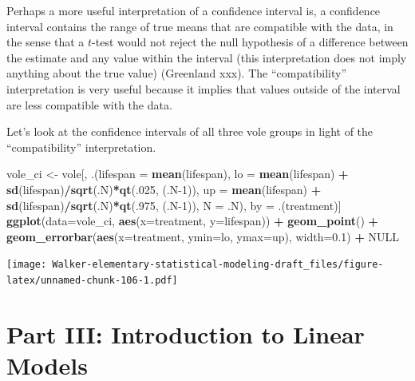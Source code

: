 \documentclass[]{book}
\newenvironment{Shaded}{\begin{snugshade}}{\end{snugshade}}
\newcommand{\DataTypeTok}[1]{\textcolor[rgb]{0.13,0.29,0.53}{#1}}
\newcommand{\DecValTok}[1]{\textcolor[rgb]{0.00,0.00,0.81}{#1}}
\newcommand{\FloatTok}[1]{\textcolor[rgb]{0.00,0.00,0.81}{#1}}
\newcommand{\KeywordTok}[1]{\textcolor[rgb]{0.13,0.29,0.53}{\textbf{#1}}}
\newcommand{\NormalTok}[1]{#1}
\newcommand{\OperatorTok}[1]{\textcolor[rgb]{0.81,0.36,0.00}{\textbf{#1}}}
\newcommand{\OtherTok}[1]{\textcolor[rgb]{0.56,0.35,0.01}{#1}}
\newcommand{\StringTok}[1]{\textcolor[rgb]{0.31,0.60,0.02}{#1}}
\begin{document}
Perhaps a more useful interpretation of a confidence interval is, a confidence interval contains the range of true means that are compatible with the data, in the sense that a \(t\)-test would not reject the null hypothesis of a difference between the estimate and any value within the interval (this interpretation does not imply anything about the true value) (Greenland xxx). The ``compatibility'' interpretation is very useful because it implies that values outside of the interval are less compatible with the data.

Let's look at the confidence intervals of all three vole groups in light of the ``compatibility'' interpretation.

\begin{Shaded}
\begin{Highlighting}[]
\NormalTok{vole_ci <-}\StringTok{ }\NormalTok{vole[, .(}\DataTypeTok{lifespan =} \KeywordTok{mean}\NormalTok{(lifespan),}
                    \DataTypeTok{lo =} \KeywordTok{mean}\NormalTok{(lifespan) }\OperatorTok{+}\StringTok{ }\KeywordTok{sd}\NormalTok{(lifespan)}\OperatorTok{/}\KeywordTok{sqrt}\NormalTok{(.N)}\OperatorTok{*}\KeywordTok{qt}\NormalTok{(.}\DecValTok{025}\NormalTok{, (.N}\DecValTok{-1}\NormalTok{)),}
                    \DataTypeTok{up =} \KeywordTok{mean}\NormalTok{(lifespan) }\OperatorTok{+}\StringTok{ }\KeywordTok{sd}\NormalTok{(lifespan)}\OperatorTok{/}\KeywordTok{sqrt}\NormalTok{(.N)}\OperatorTok{*}\KeywordTok{qt}\NormalTok{(.}\DecValTok{975}\NormalTok{, (.N}\DecValTok{-1}\NormalTok{)),}
                    \DataTypeTok{N =}\NormalTok{ .N),}
\NormalTok{                by =}\StringTok{ }\NormalTok{.(treatment)]}
\KeywordTok{ggplot}\NormalTok{(}\DataTypeTok{data=}\NormalTok{vole_ci, }\KeywordTok{aes}\NormalTok{(}\DataTypeTok{x=}\NormalTok{treatment, }\DataTypeTok{y=}\NormalTok{lifespan)) }\OperatorTok{+}
\StringTok{  }\KeywordTok{geom_point}\NormalTok{() }\OperatorTok{+}
\StringTok{  }\KeywordTok{geom_errorbar}\NormalTok{(}\KeywordTok{aes}\NormalTok{(}\DataTypeTok{x=}\NormalTok{treatment, }\DataTypeTok{ymin=}\NormalTok{lo, }\DataTypeTok{ymax=}\NormalTok{up), }
                \DataTypeTok{width=}\FloatTok{0.1}\NormalTok{) }\OperatorTok{+}
\StringTok{  }\OtherTok{NULL}
\end{Highlighting}
\end{Shaded}

\texttt{[image: Walker-elementary-statistical-modeling-draft\_files/figure-latex/unnamed-chunk-106-1.pdf]}

\hypertarget{part-iii-introduction-to-linear-models}{%
\chapter*{Part III: Introduction to Linear Models}\label{part-iii-introduction-to-linear-models}}
\end{document}
